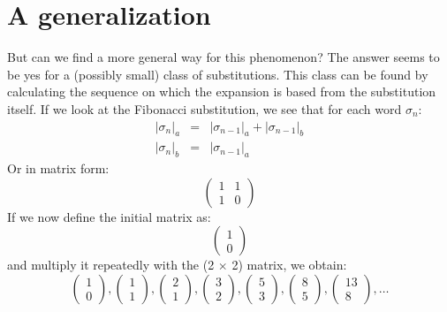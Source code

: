 \documentclass{article}
\begin{document}
\section{A generalization}
But can we find a more general way for this phenomenon? The answer seems to
be yes for a (possibly small) class of substitutions. This class can be found
by calculating the sequence on which the expansion is based from the 
substitution itself. If we look at the Fibonacci substitution, we see that for
each word $\sigma_n$:
\begin{eqnarray*}
|\sigma_n|_a &=& |\sigma_{n - 1}|_a + |\sigma_{n - 1}|_b\\
|\sigma_n|_b &=& |\sigma_{n - 1}|_a
\end{eqnarray*}
Or in matrix form:
\begin{displaymath} \left( \begin{array}{cc}
1 & 1\\
1 & 0
\end{array} \right) \end{displaymath}
If we now define the initial matrix as:
\begin{displaymath} \left( \begin{array}{c}
1 \\
0 
\end{array} \right) \end{displaymath}
and multiply it repeatedly with the (2 $\times$ 2) matrix, we obtain:
\begin{displaymath} 
\left( \begin{array}{c}
1 \\
0 
\end{array} \right),
\left( \begin{array}{c}
1 \\
1 
\end{array} \right),
\left( \begin{array}{c}
2 \\
1 
\end{array} \right),
\left( \begin{array}{c}
3 \\
2 
\end{array} \right),
\left( \begin{array}{c}
5 \\
3 
\end{array} \right),
\left( \begin{array}{c}
8 \\
5 
\end{array} \right),
\left( \begin{array}{c}
13 \\
8 
\end{array} \right), \ldots
\end{displaymath}
\end{document}
